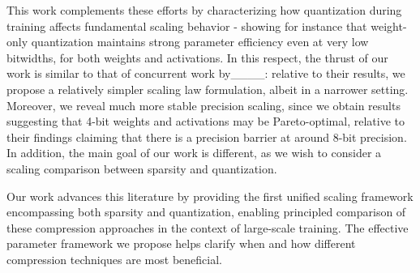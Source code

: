 This work complements these efforts by characterizing how quantization during training affects fundamental scaling behavior - showing for instance that weight-only quantization maintains strong parameter efficiency even at very low bitwidths, for both weights and activations. 
In this respect, the thrust of our work is similar to that of concurrent work by____: relative to their results, we propose a relatively simpler scaling law formulation, albeit in a narrower setting. Moreover, we reveal much more stable precision scaling, since we obtain results suggesting that 4-bit weights and activations may be Pareto-optimal, relative to their findings claiming that there is a precision barrier at around 8-bit precision. In addition, the main goal of our work is different, as we wish to consider a scaling comparison between sparsity and quantization. 

Our work advances this literature by providing the first unified scaling framework encompassing both sparsity and quantization, enabling principled comparison of these compression approaches in the context of large-scale training. The effective parameter framework we propose helps clarify when and how different compression techniques are most beneficial.